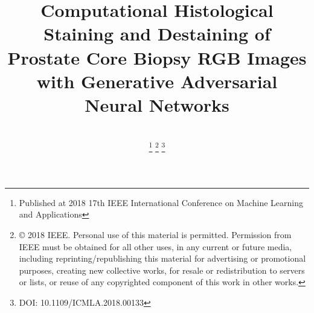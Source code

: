 \documentclass[10pt, conference, compsocconf]{IEEEtran}
\begin{document}
\IEEEoverridecommandlockouts
%
\title{Computational Histological Staining and Destaining of Prostate Core Biopsy RGB Images with Generative Adversarial Neural Networks}



\author{ \\
\thanks{Published at 2018 17th IEEE International Conference on Machine Learning and Applications}
\thanks{© 2018 IEEE.  Personal use of this material is permitted.  Permission from IEEE must be obtained for all other uses, in any current or future media, including reprinting/republishing this material for advertising or promotional purposes, creating new collective works, for resale or redistribution to servers or lists, or reuse of any copyrighted component of this work in other works.}
\thanks{DOI: 10.1109/ICMLA.2018.00133}
}


% 
%
\end{document}

